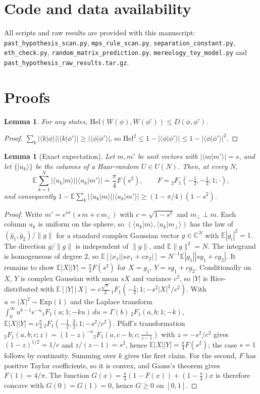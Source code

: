 \documentclass[11pt]{article}
\newtheorem{lemma}[theorem]{Lemma}
\theoremstyle{definition}
\theoremstyle{remark}
\newcommand{\ket}[1]{|#1\rangle}
\newcommand{\braket}[2]{\langle #1|#2\rangle}
\newcommand{\Hel}{\mathrm{Hel}}
\newcommand{\E}{\mathbb{E}}
\begin{document}
\section*{Code and data availability}\sloppy
All scripts and raw results are provided with this manuscript: \texttt{past\_hypothesis\_scan.py}, \texttt{mps\_rule\_scan.py}, \texttt{separation\_constant.py}, \texttt{eth\_check.py}, \texttt{random\_matrix\_prediction.py}, \texttt{mereology\_toy\_model.py} and \texttt{past\_hypothesis\_raw\_results.tar.gz}.

\appendix
\section{Proofs}
\label{app:proofs}

\begin{lemma}\label{lem:helD}
For any states, $\Hel(W(\phi),W(\phi'))\le D(\phi,\phi')$.
\end{lemma}
\begin{proof}
$\sum_k|\braket{k}{\phi}||\braket{k}{\phi'}|\ge|\braket{\phi}{\phi'}|$, so $\Hel^2\le1-|\braket{\phi}{\phi'}|\le1-|\braket{\phi}{\phi'}|^2$.
\end{proof}

\begin{lemma}[Exact expectation]\label{lem:expect}
Let $m,m'$ be unit vectors with $|\braket{m}{m'}|=s$, and let $\{\ket{u_k}\}$ be the columns of a Haar-random $U\in U(N)$. Then, at every $N$,
\[
\E\sum_{k=1}^N|\braket{u_k}{m}||\braket{u_k}{m'}|=\frac\pi4F(s^2),\qquad F={}_2F_1(-\tfrac12,-\tfrac12;1;\cdot),
\]
and consequently $1-\E\sum_k|\braket{u_k}{m}||\braket{u_k}{m'}|\ge(1-\pi/4)(1-s^2)$.
\end{lemma}
\begin{proof}
Write $m'=e^{i\alpha}(s\,m+c\,m_\perp)$ with $c=\sqrt{1-s^2}$ and $m_\perp\perp m$. Each column $u_k$ is uniform on the sphere, so $(\braket{u_k}{m},\braket{u_k}{m_\perp})$ has the law of $(\bar g_1,\bar g_2)/\|g\|$ for a standard complex Gaussian vector $g\in\mathbb C^N$ with $\E|g_i|^2=1$. The direction $g/\|g\|$ is independent of $\|g\|$, and $\E\|g\|^2=N$. The integrand is homogeneous of degree 2, so $\E[|x_1||sx_1+cx_2|]=N^{-1}\E|g_1||sg_1+cg_2|$. It remains to show $\E|X||Y|=\frac\pi4F(s^2)$ for $X=g_1$, $Y=sg_1+cg_2$. Conditionally on $X$, $Y$ is complex Gaussian with mean $sX$ and variance $c^2$, so $|Y|$ is Rice-distributed with $\E[|Y|\,|\,X]=c\frac{\sqrt\pi}{2}\,{}_1F_1(-\tfrac12;1;-s^2|X|^2/c^2)$. With $u=|X|^2\sim\mathrm{Exp}(1)$ and the Laplace transform $\int_0^\infty u^{b-1}e^{-u}{}_1F_1(a;1;-ku)\,du=\Gamma(b)\,{}_2F_1(a,b;1;-k)$, $\E|X||Y|=c\frac\pi4\,{}_2F_1(-\tfrac12,\tfrac32;1;-s^2/c^2)$. Pfaff's transformation ${}_2F_1(a,b;c;z)=(1-z)^{-a}{}_2F_1(a,c-b;c;\frac{z}{z-1})$ with $z=-s^2/c^2$ gives $(1-z)^{1/2}=1/c$ and $z/(z-1)=s^2$, hence $\E|X||Y|=\frac\pi4F(s^2)$; the case $s=1$ follows by continuity. Summing over $k$ gives the first claim. For the second, $F$ has positive Taylor coefficients, so it is convex, and Gauss's theorem gives $F(1)=4/\pi$. The function $G(x)=\frac\pi4(1-F(x))+(1-\frac\pi4)x$ is therefore concave with $G(0)=G(1)=0$, hence $G\ge0$ on $[0,1]$.
\end{proof}
\end{document}
